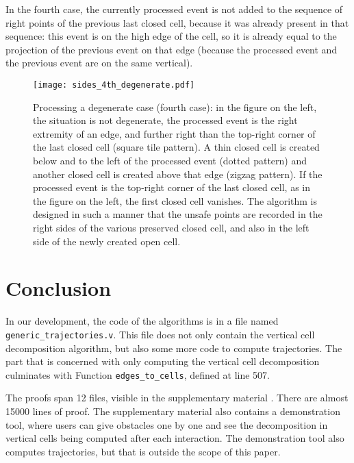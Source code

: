 \documentclass[a4paper, USenglish, cleveref, autoref, thm-restate, final]{lipics-v2021}
\begin{document}
In the fourth case, the currently processed event is not added to the
sequence of right points of the previous last closed cell, because it
was already present in that sequence: this event is on the high edge of
the cell, so it is already equal to the projection of the previous event
on that edge (because the processed event and the previous event are on
the same vertical).

\begin{figure}
\begin{center}
\texttt{[image: sides\_4th\_degenerate.pdf]}
\end{center}
\caption{Processing a degenerate case (fourth case):
  in the figure on the left, the situation is not degenerate, the
   processed event is the right extremity
  of an edge, and further right than the top-right corner of the last
  closed cell (square tile pattern).
  A   thin closed cell is created below and to the left of the processed
  event (dotted pattern) and another closed cell
  is created above that edge (zigzag pattern).  If the processed event
  is the top-right corner of the last closed cell, as in the figure on
  the left, the first closed
  cell vanishes.  The algorithm is designed in such a manner that the
  unsafe points are recorded in the right sides of the various
  preserved closed cell, and also in the left side of the newly
  created open cell.
  }
\label{fig:third_case_degenerate}
\end{figure}
\section{Conclusion}
In our development, the code of the algorithms is in a
file named {\tt generic\_trajectories.v}.  This file does not only contain
the vertical cell decomposition algorithm, but also some more code to compute
trajectories.  The part that is concerned with only computing the vertical
cell decomposition culminates with Function {\tt edges\_to\_cells}, defined
at line 507.

The proofs span 12 files, visible in the supplementary material \cite{suppl_material}.
There are almost 15000 lines of proof.  The supplementary material also
contains a demonstration tool, where users can give obstacles one by one
and see the decomposition in vertical cells being computed after each
interaction.  The demonstration tool also computes trajectories, but that
is outside the scope of this paper.
\end{document}
